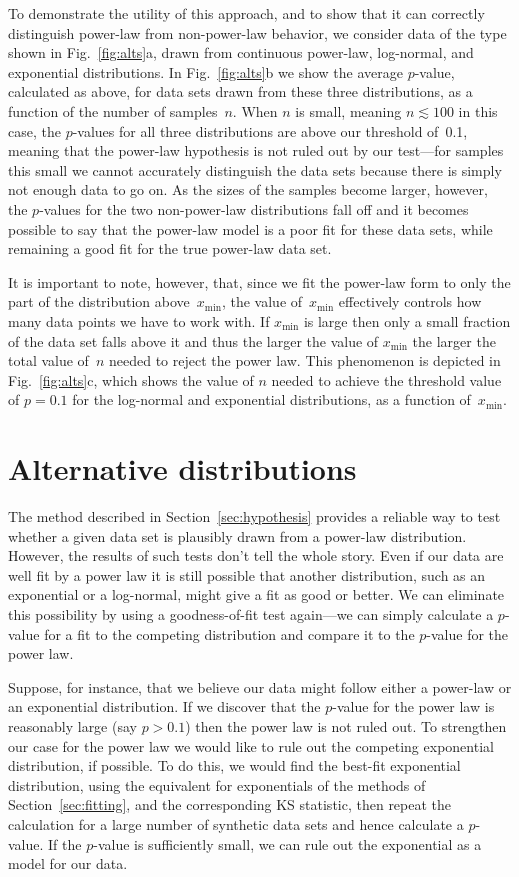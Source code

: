 \documentclass[final]{siamltex}
\newcommand{\xmin}{\ensuremath{x_{\min}}}
\begin{document}
To demonstrate the utility of this approach, and to show that it can
correctly distinguish power-law from non-power-law behavior, we consider
data of the type shown in Fig.~\ref{fig:alts}a, drawn from continuous
power-law, log-normal, and exponential distributions.  In
Fig.~\ref{fig:alts}b we show the average $p$-value, calculated as above,
for data sets drawn from these three distributions, as a function of the
number of samples~$n$.  When $n$ is small, meaning $n\lesssim100$ in this
case, the $p$-values for all three distributions are above our threshold
of~0.1, meaning that the power-law hypothesis is not ruled out by our
test---for samples this small we cannot accurately distinguish the data
sets because there is simply not enough data to go on.  As the sizes of the
samples become larger, however, the $p$-values for the two non-power-law
distributions fall off and it becomes possible to say that the power-law
model is a poor fit for these data sets, while remaining a good fit for the
true power-law data set.

It is important to note, however, that, since we fit the power-law form to
only the part of the distribution above~$\xmin$, the value of~$\xmin$
effectively controls how many data points we have to work with.  If $\xmin$
is large then only a small fraction of the data set falls above it and thus
the larger the value of $\xmin$ the larger the total value of~$n$ needed to
reject the power law.  This phenomenon is depicted in Fig.~\ref{fig:alts}c,
which shows the value of $n$ needed to achieve the threshold value of
$p=0.1$ for the log-normal and exponential distributions, as a function
of~$\xmin$.


\section{Alternative distributions}
\label{sec:alttesting}
The method described in Section~\ref{sec:hypothesis} provides a reliable
way to test whether a given data set is plausibly drawn from a power-law
distribution.  However, the results of such tests don't tell the whole
story.  Even if our data are well fit by a power law it is still possible
that another distribution, such as an exponential or a log-normal, might
give a fit as good or better.  We can eliminate this possibility by using a
goodness-of-fit test again---we can simply calculate a $p$-value for a fit
to the competing distribution and compare it to the $p$-value for the power
law.

Suppose, for instance, that we believe our data might follow either a
power-law or an exponential distribution.  If we discover that the
$p$-value for the power law is reasonably large (say $p>0.1$) then the
power law is not ruled out.  To strengthen our case for the power law we
would like to rule out the competing exponential distribution, if possible.
To do this, we would find the best-fit exponential distribution, using the
equivalent for exponentials of the methods of Section~\ref{sec:fitting},
and the corresponding KS statistic, then repeat the calculation for a large
number of synthetic data sets and hence calculate a $p$-value.  If the
$p$-value is sufficiently small, we can rule out the exponential as a model
for our data.
\end{document}
